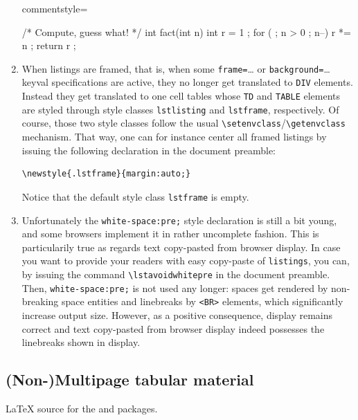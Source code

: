 \begin{enumerate}
{commentstyle={\em\color{magenta}}}%
{\lstset{language=C, style=colors}}
{}
\begin{clisting}
/* Compute, guess what! */
int fact(int n) {
  int r = 1 ;
  for ( ; n > 0 ; n--) {
    r *= n ;
  }
  return r ;
}
\end{clisting}
\endgroup\fi
\item When listings are framed, that is, when  some
\texttt{frame=}\ldots{} or \texttt{background=}\ldots{} keyval
specifications are active, they no longer get translated to \verb+DIV+
elements.
Instead they get translated to one cell tables whose \verb+TD+
and \verb+TABLE+ elements
are styled through style classes \texttt{lstlisting} and
\texttt{lstframe}, respectively. Of course, those two style classes
follow the usual \verb+\setenvclass+/\verb+\getenvclass+ mechanism.
That way, one can for instance center all framed listings by issuing
the following declaration in the document preamble:
\begin{verbatim}
\newstyle{.lstframe}{margin:auto;}
\end{verbatim}
Notice that the default style class \texttt{lstframe} is empty.

\item {}%
Unfortunately the \verb+white-space:pre;+ style declaration is still a
bit young, and some browsers implement it in rather uncomplete
fashion.  This is particularily true as regards text copy-pasted from
browser display.  In case you want to provide your readers with easy
copy-paste of \texttt{listings}, you can, by issuing the command
\verb+\lstavoidwhitepre+ in the document preamble.  Then,
\verb+white-space:pre;+ is not used any longer: spaces get rendered
by non-breaking space entities and linebreaks by \verb+<BR>+ elements,
which significantly increase output size.  However, as a positive
consequence, display remains correct and text copy-pasted from browser
display indeed possesses the linebreaks shown in display.
\end{enumerate}


\subsection{(Non-)Multipage tabular material}
\LaTeX{} source
for the
and 
packages.

